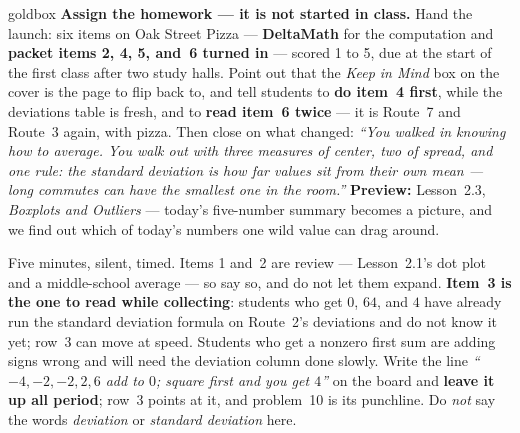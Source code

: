 \documentclass[10pt]{article}
\begin{document}
\boxguard
\begin{skillbox}{goldbox}
\textbf{Assign the homework --- it is not started in class.} Hand the launch: six items on Oak
Street Pizza --- \textbf{DeltaMath} for the computation and \textbf{packet items 2, 4, 5,
and~6 turned in} --- scored 1 to 5, due at the start of the first class after two
study halls. Point out that the \emph{Keep in Mind} box on the cover is the page to flip back
to, and tell students to \textbf{do item~4 first}, while the deviations table is fresh, and to
\textbf{read item~6 twice} --- it is Route~7 and Route~3 again, with pizza. Then close on what
changed: \emph{``You walked in knowing how to average. You walk out with three measures of
center, two of spread, and one rule: the standard deviation is how far values sit from their own
mean --- long commutes can have the smallest one in the room.''} \textbf{Preview:}
Lesson~2.3, \emph{Boxplots and Outliers} --- today's five-number summary becomes a picture, and
we find out which of today's numbers one wild value can drag around.
\end{skillbox}

\begin{teachernote}[Warm-Up]
Five minutes, silent, timed. Items 1 and~2 are review --- Lesson~2.1's dot plot and a
middle-school average --- so say so, and do not let them expand. \textbf{Item~3 is the one to
read while collecting}: students who get $0$, $64$, and $4$ have already run the standard
deviation formula on Route~2's deviations and do not know it yet; row~3 can move at speed.
Students who get a nonzero first sum are adding signs wrong and will need the deviation column
done slowly. Write the line \emph{``$-4, -2, -2, 2, 6$ add to $0$; square first and you get
$4$''} on the board and \textbf{leave it up all period}; row~3 points at it, and problem~10 is
its punchline. Do \emph{not} say the words \emph{deviation} or \emph{standard deviation} here.
\end{teachernote}
\end{document}
